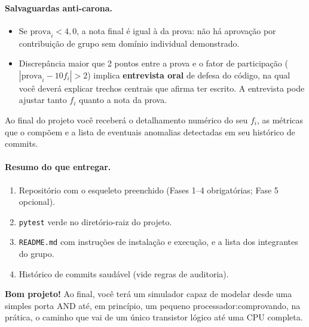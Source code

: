 \documentclass[11pt,a4paper]{article}
\begin{document}
\paragraph{Salvaguardas anti-carona.}
\begin{itemize}
    \item Se $\text{prova}_i < 4{,}0$, a nota final é igual à da prova: não há aprovação por contribuição de grupo sem domínio individual demonstrado.
    \item Discrepância maior que 2 pontos entre a prova e o fator de participação ($|\text{prova}_i - 10 f_i| > 2$) implica \textbf{entrevista oral} de defesa do código, na qual você deverá explicar trechos centrais que afirma ter escrito. A entrevista pode ajustar tanto $f_i$ quanto a nota da prova.
\end{itemize}

Ao final do projeto você receberá o detalhamento numérico do seu $f_i$, as métricas que o compõem e a lista de eventuais anomalias detectadas em seu histórico de commits.

\paragraph{Resumo do que entregar.}
\begin{enumerate}
    \item Repositório com o esqueleto preenchido (Fases 1--4 obrigatórias; Fase 5 opcional).
    \item \texttt{pytest} verde no diretório-raiz do projeto.
    \item \texttt{README.md} com instruções de instalação e execução, e a lista dos integrantes do grupo.
    \item Histórico de commits saudável (vide regras de auditoria).
\end{enumerate}

\textbf{Bom projeto!} Ao final, você terá um simulador capaz de modelar desde uma simples porta AND até, em princípio, um pequeno processador:comprovando, na prática, o caminho que vai de um único transistor lógico até uma CPU completa.
\end{document}
